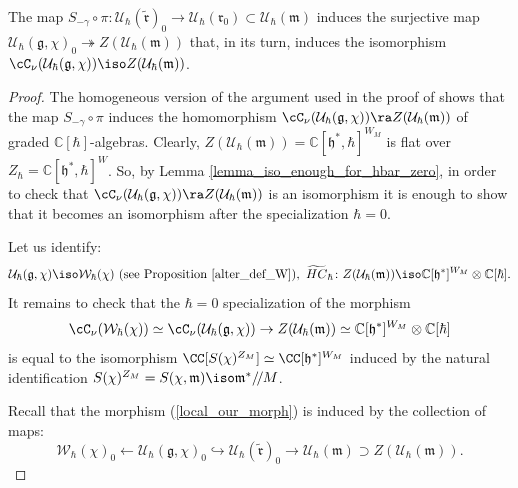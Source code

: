 \documentclass[12pt]{amsart}
\begin{document}
\begin{prop}\label{prop_cartan_subq_W_in_U_realiz}
The map $S_{-\gamma}\circ \pi \colon \mathcal{U}_{\hbar}(\widetilde{\mathfrak{r}})_0 \rightarrow \mathcal{U}_{\hbar}(\mathfrak{r}_0) \subset \mathcal{U}_\hbar(\mathfrak{m})$ induces the surjective map $\mathcal{U}_\hbar(\mathfrak{g},\chi)_0 \twoheadrightarrow Z(\mathcal{U}_\hbar(\mathfrak{m}))$ that, in its turn, induces the isomorphism $\cC_\nu(\mathcal{U}_\hbar(\mathfrak{g},\chi)) \iso Z(\mathcal{U}_\hbar(\mathfrak{m}))$. 
\end{prop}
\begin{proof}
The homogeneous version of the argument used in the proof of \cite[Theorem 4.3]{BGK} shows that the map $S_{-\gamma} \circ \pi$ induces the homomorphism $\cC_\nu(\mathcal{U}_\hbar(\mathfrak{g},\chi)) \ra Z(\mathcal{U}_\hbar(\mathfrak{m}))$ of graded $\mathbb{C}[\hbar]$-algebras. 
Clearly, $Z(\mathcal{U}_\hbar(\mathfrak{m})) = \mathbb{C}[\mathfrak{h}^*,\hbar]^{W_M}$ is flat over $Z_\hbar = \mathbb{C}[\mathfrak{h}^*,\hbar]^{W}$. 
So, by Lemma \ref{lemma_iso_enough_for_hbar_zero}, in order to check that $\cC_\nu(\mathcal{U}_\hbar(\mathfrak{g},\chi)) \ra Z(\mathcal{U}_\hbar(\mathfrak{m}))$ is an isomorphism it is enough to show that it becomes an isomorphism after the specialization $\hbar=0$. 

Let us identify:
\begin{equation*}
\mathcal{U}_\hbar(\mathfrak{g},\chi) \iso \mathcal{W}_\hbar(\chi)~\text{(see Proposition \ref{alter_def_W})},~\widetilde{HC}_{\hbar}\colon Z(\mathcal{U}_\hbar(\mathfrak{m})) \iso \mathbb{C}[\mathfrak{h}^*]^{W_M} \otimes \mathbb{C}[\hbar].
\end{equation*}
It remains to check that the $\hbar=0$ specialization of the morphism 
\begin{equation}\label{local_our_morph}
\cC_\nu(\mathcal{W}_\hbar(\chi)) 
 \simeq \cC_\nu(\mathcal{U}_\hbar(\mathfrak{g},\chi)) \rightarrow Z(\mathcal{U}_\hbar(\mathfrak{m})) \simeq \mathbb{C}[\mathfrak{h}^*]^{W_M} \otimes \mathbb{C}[\hbar]
\end{equation}
is equal to the isomorphism $\CC[S(\chi)^{Z_M}] \simeq \CC[\mathfrak{h}^*]^{W_M}$ induced by the natural identification $S(\chi)^{Z_M}=S(\chi,\mathfrak{m}) \iso \mathfrak{m}^*/\!/M$.




Recall that the morphism (\ref{local_our_morph}) is induced by the collection of maps:
\begin{equation}\label{maps_that_induce}
\mathcal{W}_{\hbar}(\chi)_0 \leftarrow \mathcal{U}_{\hbar}(\mathfrak{g},\chi)_0 \hookrightarrow \mathcal{U}_{\hbar}(\widetilde{\mathfrak{r}})_0 \rightarrow \mathcal{U}_{\hbar}(\mathfrak{m}) \supset Z(\mathcal{U}_{\hbar}(\mathfrak{m})).
\end{equation}



\end{proof}
\end{document}
